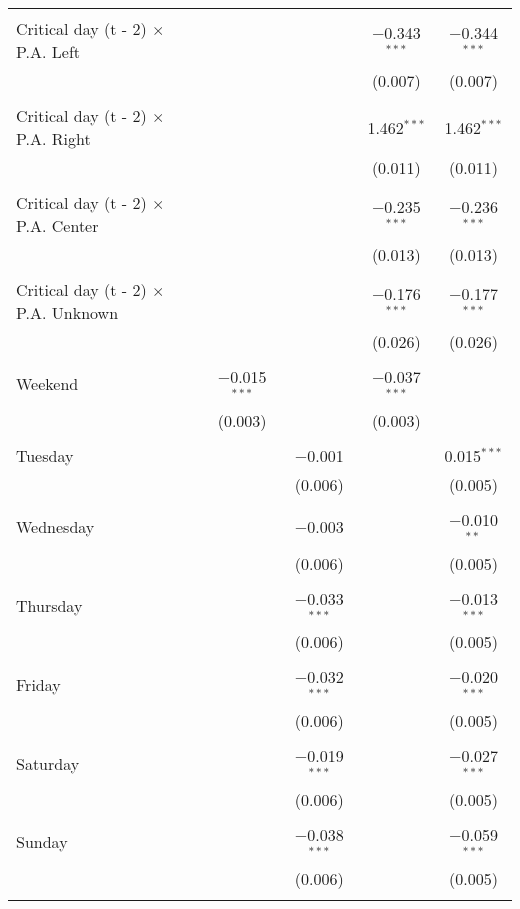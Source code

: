 \documentclass[
]{article}
\begin{document}
\begin{table}[!htbp]
{\begin{tabular}{@{\extracolsep{5pt}}lcccc}
  & & & & \\ 
 Critical day (t - 2) $\times$ P.A. Left &  &  & $-$0.343$^{***}$ & $-$0.344$^{***}$ \\ 
  &  &  & (0.007) & (0.007) \\ 
  & & & & \\ 
 Critical day (t - 2) $\times$ P.A. Right &  &  & 1.462$^{***}$ & 1.462$^{***}$ \\ 
  &  &  & (0.011) & (0.011) \\ 
  & & & & \\ 
 Critical day (t - 2) $\times$ P.A. Center &  &  & $-$0.235$^{***}$ & $-$0.236$^{***}$ \\ 
  &  &  & (0.013) & (0.013) \\ 
  & & & & \\ 
 Critical day (t - 2) $\times$ P.A. Unknown &  &  & $-$0.176$^{***}$ & $-$0.177$^{***}$ \\ 
  &  &  & (0.026) & (0.026) \\ 
  & & & & \\ 
 Weekend & $-$0.015$^{***}$ &  & $-$0.037$^{***}$ &  \\ 
  & (0.003) &  & (0.003) &  \\ 
  & & & & \\ 
 Tuesday &  & $-$0.001 &  & 0.015$^{***}$ \\ 
  &  & (0.006) &  & (0.005) \\ 
  & & & & \\ 
 Wednesday &  & $-$0.003 &  & $-$0.010$^{**}$ \\ 
  &  & (0.006) &  & (0.005) \\ 
  & & & & \\ 
 Thursday &  & $-$0.033$^{***}$ &  & $-$0.013$^{***}$ \\ 
  &  & (0.006) &  & (0.005) \\ 
  & & & & \\ 
 Friday &  & $-$0.032$^{***}$ &  & $-$0.020$^{***}$ \\ 
  &  & (0.006) &  & (0.005) \\ 
  & & & & \\ 
 Saturday &  & $-$0.019$^{***}$ &  & $-$0.027$^{***}$ \\ 
  &  & (0.006) &  & (0.005) \\ 
  & & & & \\ 
 Sunday &  & $-$0.038$^{***}$ &  & $-$0.059$^{***}$ \\ 
  &  & (0.006) &  & (0.005) \\ 
  & & & & \\ 

\end{tabular}}
\end{table}
\end{document}
